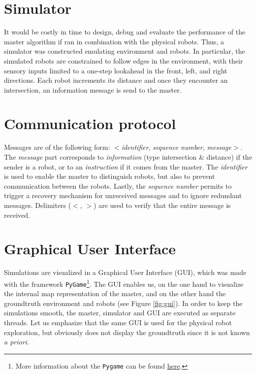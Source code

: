 \documentclass[12pt]{report}
\begin{document}
\section{Simulator}
It would be costly in time to design, debug and evaluate the performance of the master algorithm if ran in combination with the physical robots. Thus, a simulator was constructed emulating environment and robots. In particular, the simulated robots are constrained to follow edges in the environment, with their sensory inputs limited to a one-step lookahead in the front, left, and right directions. Each robot increments its distance and once they encounter an intersection, an information message is send to the master.

\section{Communication protocol}
Messages are of the following form: $<$\textit{identifier}, \textit{sequence number}, \textit{message}$>$. The \textit{message} part corresponds to \textit{information} (type intersection \& distance) if the sender is a robot, or to an \textit{instruction} if it comes from the master. The \textit{identifier} is used to enable the master to distinguish robots, but also to prevent communication between the robots. Lastly, the \textit{sequence number} permits to trigger a recovery mechanism for unreceived messages and to ignore redundant messages. Delimiters ($<$, $>$) are used to verify that the entire message is received.

\section{Graphical User Interface}
Simulations are visualized in a Graphical User Interface (GUI), which was made with the framework \texttt{PyGame}\footnote{More information about the \texttt{Pygame} can be found \href{www.pygame.org}{here}.}. The GUI enables us, on the one hand to visualize the internal map representation of the master, and on the other hand the groundtruth environment and robots (see Figure \ref{fig:gui}). In order to keep the simulations smooth, the master, simulator and GUI are executed as separate threads. Let us emphasize that the same GUI is used for the physical robot exploration, but obviously does not display the groundtruth since it is not known \textit{a priori}. 
\end{document}
